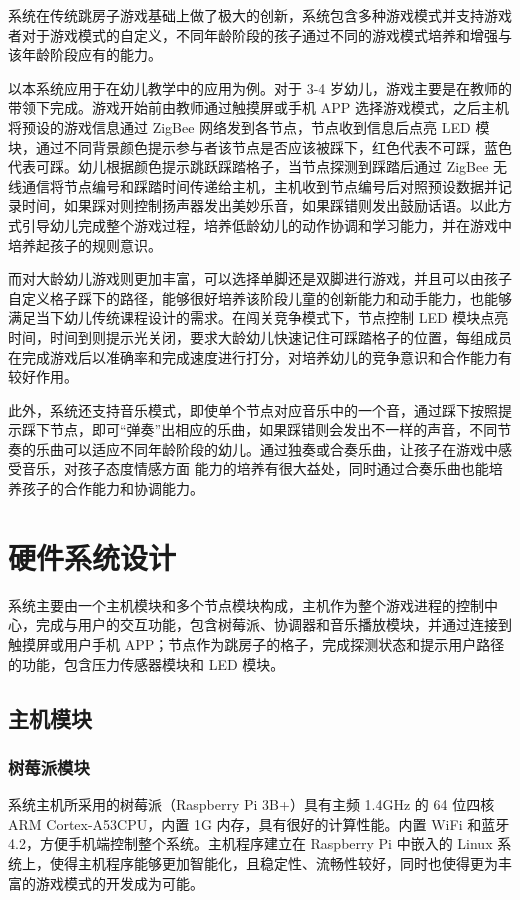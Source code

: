 \begin{spacing}{1.2}
   系统在传统跳房子游戏基础上做了极大的创新，系统包含多种游戏模式并支持游戏者对于游戏模式的自定义，不同年龄阶段的孩子通过不同的游戏模式培养和增强与该年龄阶段应有的能力\supercite{5}。

    以本系统应用于在幼儿教学中的应用为例。对于 3-4 岁幼儿，游戏主要是在教师的带领下完成。游戏开始前由教师通过触摸屏或手机 APP 选择游戏模式，之后主机将预设的游戏信息通过 ZigBee 网络发到各节点，节点收到信息后点亮 LED 模块，通过不同背景颜色提示参与者该节点是否应该被踩下，红色代表不可踩，蓝色代表可踩。幼儿根据颜色提示跳跃踩踏格子，当节点探测到踩踏后通过 ZigBee 无线通信将节点编号和踩踏时间传递给主机，主机收到节点编号后对照预设数据并记录时间，如果踩对则控制扬声器发出美妙乐音，如果踩错则发出鼓励话语。以此方式引导幼儿完成整个游戏过程，培养低龄幼儿的动作协调和学习能力，并在游戏中培养起孩子的规则意识。

    而对大龄幼儿游戏则更加丰富，可以选择单脚还是双脚进行游戏，并且可以由孩子自定义格子踩下的路径，能够很好培养该阶段儿童的创新能力和动手能力，也能够满足当下幼儿传统课程设计的需求\supercite{4}。在闯关竞争模式下，节点控制 LED 模块点亮时间，时间到则提示光关闭，要求大龄幼儿快速记住可踩踏格子的位置，每组成员在完成游戏后以准确率和完成速度进行打分，对培养幼儿的竞争意识和合作能力有较好作用。

    此外，系统还支持音乐模式，即使单个节点对应音乐中的一个音，通过踩下按照提示踩下节点，即可“弹奏”出相应的乐曲，如果踩错则会发出不一样的声音，不同节奏的乐曲可以适应不同年龄阶段的幼儿。通过独奏或合奏乐曲，让孩子在游戏中感受音乐，对孩子态度情感方面\supercite{9} 能力的培养有很大益处，同时通过合奏乐曲也能培养孩子的合作能力和协调能力\supercite{11}。

\section{硬件系统设计}
    系统主要由一个主机模块和多个节点模块构成，主机作为整个游戏进程的控制中心，完成与用户的交互功能，包含树莓派、协调器和音乐播放模块，并通过连接到触摸屏或用户手机 APP；节点作为跳房子的格子，完成探测状态和提示用户路径的功能，包含压力传感器模块和 LED 模块。

    \subsection{主机模块}
    \subsubsection{树莓派模块}
    系统主机所采用的树莓派（Raspberry Pi 3B+）具有主频 1.4GHz 的 64 位四核 ARM Cortex-A53CPU，内置 1G 内存，具有很好的计算性能。内置 WiFi 和蓝牙 4.2，方便手机端控制整个系统。主机程序建立在 Raspberry Pi 中嵌入的 Linux 系统上，使得主机程序能够更加智能化，且稳定性、流畅性较好，同时也使得更为丰富的游戏模式的开发成为可能\supercite{12}。


\end{spacing}
